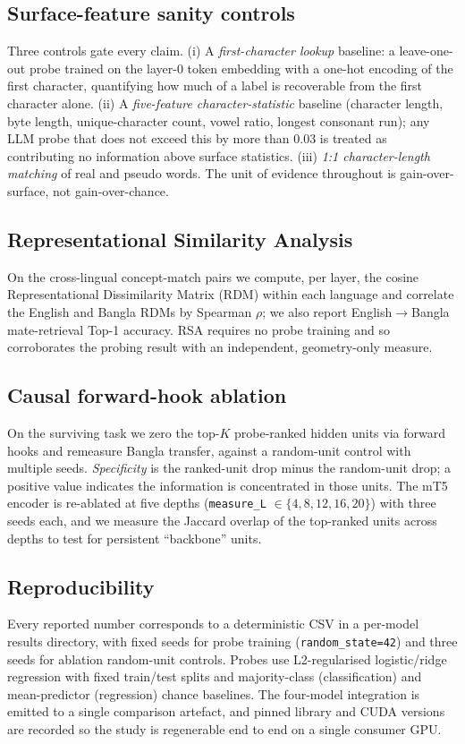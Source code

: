 \documentclass[conference]{IEEEtran}
\begin{document}
\subsection{Surface-feature sanity controls}
Three controls gate every claim. (i) A \emph{first-character lookup} baseline: a leave-one-out probe trained on the layer-0 token embedding with a one-hot encoding of the first character, quantifying how much of a label is recoverable from the first character alone. (ii) A \emph{five-feature character-statistic} baseline (character length, byte length, unique-character count, vowel ratio, longest consonant run); any LLM probe that does not exceed this by more than 0.03 is treated as contributing no information above surface statistics. (iii) \emph{1:1 character-length matching} of real and pseudo words. The unit of evidence throughout is gain-over-surface, not gain-over-chance.

\subsection{Representational Similarity Analysis}
On the cross-lingual concept-match pairs we compute, per layer, the cosine Representational Dissimilarity Matrix (RDM) within each language and correlate the English and Bangla RDMs by Spearman $\rho$; we also report English$\to$Bangla mate-retrieval Top-1 accuracy. RSA requires no probe training and so corroborates the probing result with an independent, geometry-only measure.

\subsection{Causal forward-hook ablation}
On the surviving task we zero the top-$K$ probe-ranked hidden units via forward hooks and remeasure Bangla transfer, against a random-unit control with multiple seeds. \emph{Specificity} is the ranked-unit drop minus the random-unit drop; a positive value indicates the information is concentrated in those units. The mT5 encoder is re-ablated at five depths (\texttt{measure\_L} $\in\{4,8,12,16,20\}$) with three seeds each, and we measure the Jaccard overlap of the top-ranked units across depths to test for persistent ``backbone'' units.

\subsection{Reproducibility}
Every reported number corresponds to a deterministic CSV in a per-model results directory, with fixed seeds for probe training (\texttt{random\_state=42}) and three seeds for ablation random-unit controls. Probes use L2-regularised logistic/ridge regression with fixed train/test splits and majority-class (classification) and mean-predictor (regression) chance baselines. The four-model integration is emitted to a single comparison artefact, and pinned library and CUDA versions are recorded so the study is regenerable end to end on a single consumer GPU.
\end{document}
